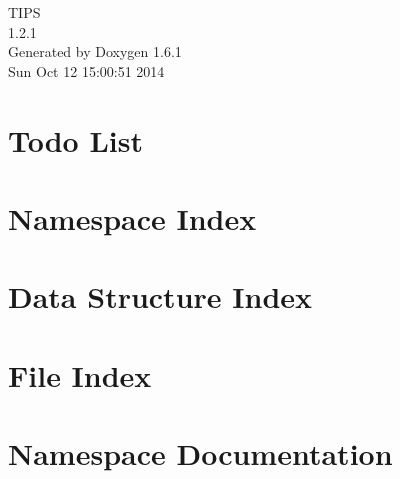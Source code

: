 \documentclass[a4paper]{book}
\begin{document}
\hypersetup{pageanchor=false}
\begin{titlepage}
\vspace*{7cm}
\begin{center}
{\Large TIPS \\[1ex]\large 1.2.1 }\\
\vspace*{1cm}
{\large Generated by Doxygen 1.6.1}\\
\vspace*{0.5cm}
{\small Sun Oct 12 15:00:51 2014}\\
\end{center}
\end{titlepage}
\clearemptydoublepage
{}
\tableofcontents
\clearemptydoublepage
{}
\hypersetup{pageanchor=true}
\chapter{Todo List}
\label{todo}
\hypertarget{todo}{}

\chapter{Namespace Index}

\chapter{Data Structure Index}

\chapter{File Index}

\chapter{Namespace Documentation}













































\end{document}

